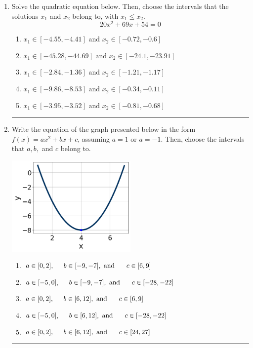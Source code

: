 \documentclass[14pt]{extbook}
\newcommand{\litem}[1]{\item#1\hspace*{-1cm}\rule{\textwidth}{0.4pt}}
\begin{document}
\begin{enumerate}
\litem{
Solve the quadratic equation below. Then, choose the intervals that the solutions $x_1$ and $x_2$ belong to, with $x_1 \leq x_2$.\[ 20x^{2} +69 x + 54 = 0 \]\begin{enumerate}[label=\Alph*.]
\item \( x_1 \in [-4.55, -4.41] \text{ and } x_2 \in [-0.72, -0.6] \)
\item \( x_1 \in [-45.28, -44.69] \text{ and } x_2 \in [-24.1, -23.91] \)
\item \( x_1 \in [-2.84, -1.36] \text{ and } x_2 \in [-1.21, -1.17] \)
\item \( x_1 \in [-9.86, -8.53] \text{ and } x_2 \in [-0.34, -0.11] \)
\item \( x_1 \in [-3.95, -3.52] \text{ and } x_2 \in [-0.81, -0.68] \)

\end{enumerate} }
\litem{
Write the equation of the graph presented below in the form $f(x)=ax^2+bx+c$, assuming  $a=1$ or $a=-1$. Then, choose the intervals that $a, b,$ and $c$ belong to.
\begin{center}
    \includegraphics[width=0.5\textwidth]{../Figures/quadraticGraphToEquationC.png}
\end{center}
\begin{enumerate}[label=\Alph*.]
\item \( a \in [0, 2], \hspace*{5mm} b \in [-9, -7], \text{ and } \hspace*{5mm} c \in [6, 9] \)
\item \( a \in [-5, 0], \hspace*{5mm} b \in [-9, -7], \text{ and } \hspace*{5mm} c \in [-28, -22] \)
\item \( a \in [0, 2], \hspace*{5mm} b \in [6, 12], \text{ and } \hspace*{5mm} c \in [6, 9] \)
\item \( a \in [-5, 0], \hspace*{5mm} b \in [6, 12], \text{ and } \hspace*{5mm} c \in [-28, -22] \)
\item \( a \in [0, 2], \hspace*{5mm} b \in [6, 12], \text{ and } \hspace*{5mm} c \in [24, 27] \)


\end{enumerate}}
\end{enumerate}
\end{document}
